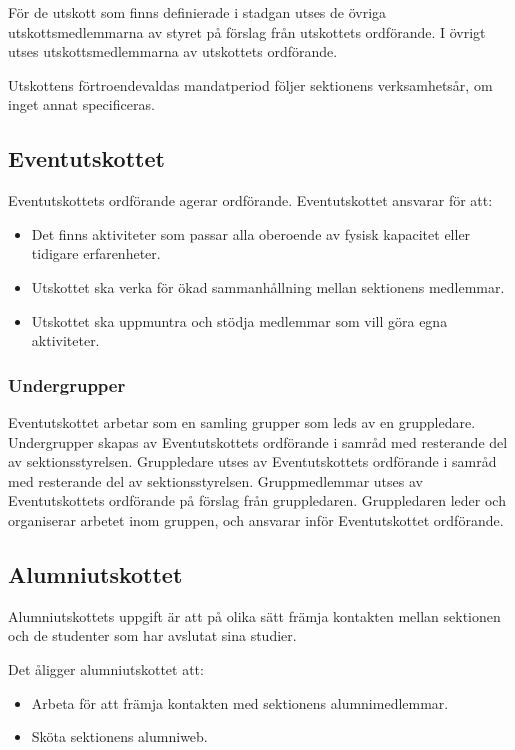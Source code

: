 \documentclass{datateknologsektionen-document}
\begin{document}
För de utskott som finns definierade i stadgan utses de övriga utskottsmedlemmarna av
styret på förslag från utskottets ordförande. I övrigt utses utskottsmedlemmarna av
utskottets ordförande.

Utskottens förtroendevaldas mandatperiod följer sektionens verksamhetsår, om inget annat specificeras.

\subsection{Eventutskottet}
Eventutskottets ordförande agerar ordförande. Eventutskottet ansvarar för att:
\begin{itemize}
  \item Det finns aktiviteter som passar alla oberoende av fysisk kapacitet eller tidigare erfarenheter.
  \item Utskottet ska verka för ökad sammanhållning mellan sektionens medlemmar.
  \item Utskottet ska uppmuntra och stödja medlemmar som vill göra egna aktiviteter.
\end{itemize}

\subsubsection{Undergrupper}
Eventutskottet arbetar som en samling grupper som leds av en gruppledare. Undergrupper skapas
av Eventutskottets ordförande i samråd med resterande del av sektionsstyrelsen.
Gruppledare utses av Eventutskottets ordförande i samråd med resterande del av sektionsstyrelsen. Gruppmedlemmar utses av
Eventutskottets ordförande på förslag från gruppledaren. Gruppledaren leder och
organiserar arbetet inom gruppen, och ansvarar inför Eventutskottet ordförande.

\subsection{Alumniutskottet}
Alumniutskottets uppgift är att på olika sätt främja kontakten mellan sektionen
och de studenter som har avslutat sina studier.

Det åligger alumniutskottet att:
\begin{itemize}
  \item Arbeta för att främja kontakten med sektionens alumnimedlemmar.
  \item Sköta sektionens alumniweb.
\end{itemize}
\end{document}
